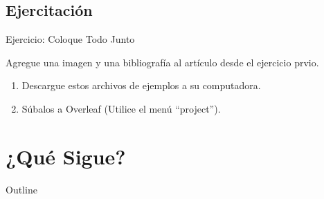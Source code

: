 \documentclass{beamer}
\begin{document}
\subsection{Ejercitación}
\begin{frame}[fragile]{Ejercicio: Coloque Todo Junto}
  
  Agregue una imagen y una bibliografía al artículo desde el ejercicio prvio.
  
  \begin{enumerate}
  \item Descargue estos archivos de ejemplos a su computadora.

    \begin{center}
      
    \end{center}
    
  \item Súbalos a  Overleaf (Utilice el menú ``project'').
    
  \end{enumerate}
\end{frame}

\section{¿Qué Sigue?}

\begin{frame}{Outline}
  \begin{multicols}{2}
    \tableofcontents[currentsection]
  \end{multicols}
\end{frame}
\end{document}

